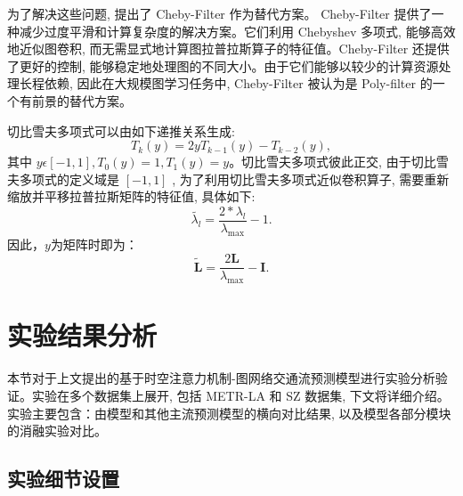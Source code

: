 为了解决这些问题, \textcite{2016_Defferrard_Convolutional_neural_networks_on_graphs_with_fast_localized_spectral_filtering} 提出了 Cheby-Filter 作为替代方案。 Cheby-Filter 提供了一种减少过度平滑和计算复杂度的解决方案。它们利用 Chebyshev 多项式, 能够高效地近似图卷积, 而无需显式地计算图拉普拉斯算子的特征值。Cheby-Filter 还提供了更好的控制, 能够稳定地处理图的不同大小。由于它们能够以较少的计算资源处理长程依赖, 因此在大规模图学习任务中, Cheby-Filter 被认为是 Poly-filter 的一个有前景的替代方案。

切比雪夫多项式可以由如下递推关系生成:
\begin{equation}
{T}_{k}\left( y\right)  = {2y}{T}_{k - 1}\left( y\right)  - {T}_{k - 2}\left( y\right), 
\end{equation}
其中 \({y\epsilon }\left\lbrack  {-1, 1}\right\rbrack  , {T}_{0}\left( y\right)  = 1, {T}_{1}\left( y\right)  = y\)。切比雪夫多项式彼此正交, 由于切比雪夫多项式的定义域是 \(\left\lbrack  {-1, 1}\right\rbrack\) , 为了利用切比雪夫多项式近似卷积算子, 需要重新缩放并平移拉普拉斯矩阵的特征值, 具体如下:
\begin{equation}
\widetilde{{\lambda }_{l}} = \frac{2 * {\lambda }_{l}}{{\lambda }_{\max }} - 1.
\end{equation}
因此，$y$为矩阵时即为：
\begin{equation}\tilde{\boldsymbol{L}}=\frac{2\boldsymbol{L}}{\lambda_{\max}}-\boldsymbol{I}.\end{equation}


\section{实验结果分析}
本节对于上文提出的基于时空注意力机制-图网络交通流预测模型进行实验分析验证。实验在多个数据集上展开, 包括 METR-LA 和 SZ 数据集, 下文将详细介绍。实验主要包含：由模型和其他主流预测模型的横向对比结果, 以及模型各部分模块的消融实验对比。

\subsection{实验细节设置}


